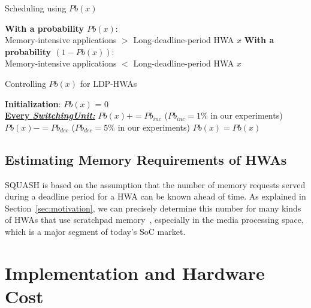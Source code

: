 \documentclass[10pt,letterpaper]{article}
\newif\ifSQUEEZE
\begin{document}
\vspace{-2mm}
\begin{algorithm}[t!]
\caption{Scheduling using $Pb(x)$}
\label{alg:sched_pb}
\small
\begin{algorithmic}
\STATE \textbf{With a probability $Pb(x)$}: \\
Memory-intensive applications $>$ Long-deadline-period HWA $x$
\STATE \textbf{With a probability $(1-Pb(x))$}: \\
Memory-intensive applications $<$ Long-deadline-period HWA $x$
\end{algorithmic}
\end{algorithm}
\vspace{-2mm}

\begin{algorithm}[t!]
\caption{Controlling $Pb(x)$ for LDP-HWAs}
\label{alg:cntl_pb}
\small
\begin{algorithmic}
\STATE \textbf{Initialization}: $Pb(x)$ = 0\\
\textbf{\underline{Every {\it SwitchingUnit:}}}
\STATE $Pb(x) \mathrel{{+}{=}} Pb_{inc}$ ($Pb_{inc} = 1\%$ in our experiments)
\STATE $Pb(x) \mathrel{{-}{=}} Pb_{dec}$ ($Pb_{dec} = 5\%$ in our experiments)
\ELSE
\STATE $Pb(x) = Pb(x)$
\ENDIF
\end{algorithmic}
\end{algorithm}
\vspace{-5mm}

\ifSQUEEZE
\else
\subsection{Estimating Memory Requirements of HWAs}

SQUASH is based on the assumption that the number of memory requests served
during a deadline period for a HWA can be known ahead of time. As explained in
Section~\ref{sec:motivation}, we can precisely determine this number for many
kinds of HWAs that use scratchpad
memory~\cite{resizing,HWA_sift,HWA_face,HWA_acoustic,mra}, especially in the
media processing space, which is a major segment of today's SoC market.
\fi




 \section{Implementation and Hardware Cost}
\end{document}
